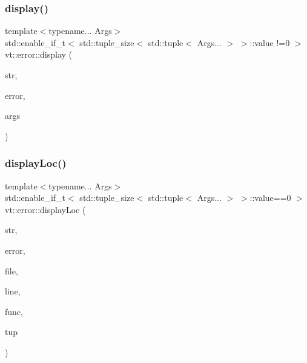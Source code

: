 \subsubsection{\texorpdfstring{display()}{display()}\hspace{0.1cm}{\footnotesize\ttfamily [2/2]}}
{\footnotesize\ttfamily template$<$typename... Args$>$ \\
std\+::enable\+\_\+if\+\_\+t$<$ std\+::tuple\+\_\+size$<$ std\+::tuple$<$ Args... $>$ $>$\+::value !=0 $>$ vt\+::error\+::display (\begin{DoxyParamCaption}\item[{std\+::string const \&}]{str,  }\item[{\hyperlink{namespacevt_a793764d753923abc3d32929870beb485}{Error\+Code\+Type}}]{error,  }\item[{Args \&\&...}]{args }\end{DoxyParamCaption})\hspace{0.3cm}{\ttfamily [inline]}}

\mbox{\label{namespacevt_1_1error_aa70787af3ebae733184d780cc5678791}} 
\subsubsection{\texorpdfstring{display\+Loc()}{displayLoc()}\hspace{0.1cm}{\footnotesize\ttfamily [1/2]}}
{\footnotesize\ttfamily template$<$typename... Args$>$ \\
std\+::enable\+\_\+if\+\_\+t$<$ std\+::tuple\+\_\+size$<$ std\+::tuple$<$ Args... $>$ $>$\+::value==0 $>$ vt\+::error\+::display\+Loc (\begin{DoxyParamCaption}\item[{std\+::string const \&}]{str,  }\item[{\hyperlink{namespacevt_a793764d753923abc3d32929870beb485}{Error\+Code\+Type}}]{error,  }\item[{std\+::string const \&}]{file,  }\item[{int const}]{line,  }\item[{std\+::string const \&}]{func,  }\item[{std\+::tuple$<$ Args... $>$ \&\&}]{tup }\end{DoxyParamCaption})\hspace{0.3cm}{\ttfamily [inline]}}

